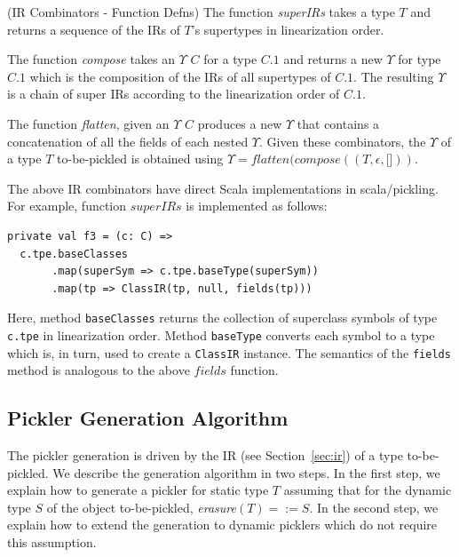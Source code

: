 \documentclass[10pt]{sigplanconf}
\theoremstyle{definition}
\theoremstyle{definition}
\begin{document}
\begin{defn}{(IR Combinators - Function Defns)}
The function \textit{superIRs} takes a type $T$ and returns a sequence of the
IRs of $T$'s supertypes in linearization order.

The function \textit{compose} takes an $\Upsilon$ $C$ for a type $C.1$ and returns a
new $\Upsilon$ for type $C.1$ which is the composition of the IRs of all supertypes
of $C.1$. The resulting $\Upsilon$ is a chain of super IRs according to the
linearization order of $C.1$.

The function \textit{flatten}, given an $\Upsilon$ $C$ produces a new $\Upsilon$ that
contains a concatenation of all the fields of each nested $\Upsilon$. Given
these combinators, the $\Upsilon$ of a type $T$ to-be-pickled is obtained
using $\Upsilon = flatten(compose((T, \epsilon, \lbrack \rbrack))$.
\end{defn}



The above IR combinators have direct Scala implementations in scala/pickling.
For example, function $superIRs$ is implemented as follows:

\begin{lstlisting}
private val f3 = (c: C) =>
  c.tpe.baseClasses
       .map(superSym => c.tpe.baseType(superSym))
       .map(tp => ClassIR(tp, null, fields(tp)))
\end{lstlisting}
\noindent
Here, method \verb|baseClasses| returns the collection of superclass symbols
of type \verb|c.tpe| in linearization order. Method \verb|baseType| converts
each symbol to a type which is, in turn, used to create a \verb|ClassIR|
instance. The semantics of the \verb|fields| method is analogous to the above
$fields$ function.

\subsection{Pickler Generation Algorithm}

The pickler generation is driven by the IR (see Section~\ref{sec:ir}) of a
type to-be-pickled. We describe the generation algorithm in two steps. In the
first step, we explain how to generate a pickler for static type $T$ assuming
that for the dynamic type $S$ of the object to-be-pickled,
\textit{erasure}$(T) =:= S$. In the second step, we explain how to extend the
generation to dynamic picklers which do not require this assumption.
\end{document}
